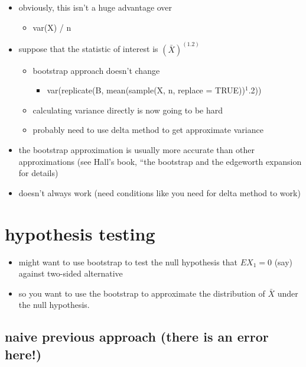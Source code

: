 \documentclass[11pt]{article}
\begin{document}
\begin{itemize}
\item obviously, this isn't a huge advantage over
\begin{itemize}
\item var(X) / n
\end{itemize}
\item suppose that the statistic of interest is $(\bar X)^(1.2)$
\begin{itemize}
\item bootstrap approach doesn't change
\begin{itemize}
\item var(replicate(B, mean(sample(X, n, replace = TRUE))$^1$.2))
\end{itemize}
\item calculating variance directly is now going to be hard
\item probably need to use delta method to get approximate variance
\end{itemize}
\item the bootstrap approximation is usually more accurate than
       other approximations (see Hall's book, ``the bootstrap and the
       edgeworth expansion for details)
\item doesn't always work (need conditions like you need for delta
       method to work)
\end{itemize}
\section{hypothesis testing}
\label{sec-2}

\begin{itemize}
\item might want to use bootstrap to test the null hypothesis that 
      $E X_1 = 0$ (say) against two-sided alternative
\item so you want to use the bootstrap to approximate the distribution
      of $\bar X$ under the null hypothesis.
\end{itemize}
\subsection{naive previous approach (there is an error here!)}
\label{sec-2-1}
\end{document}
